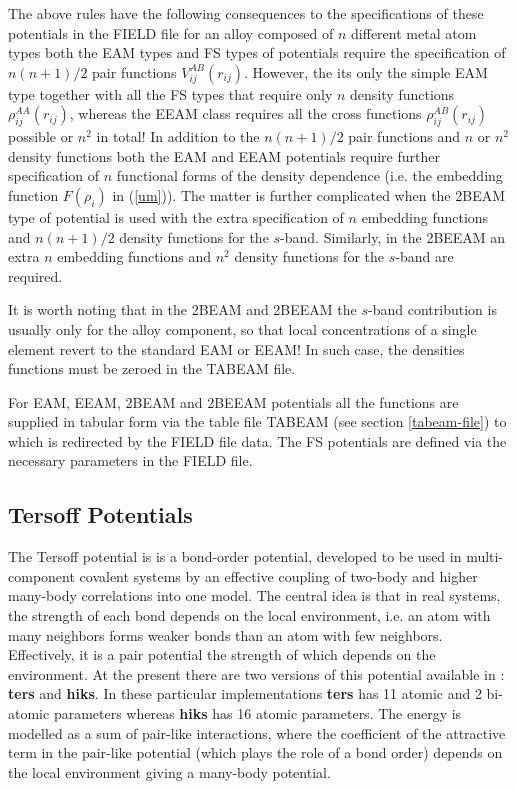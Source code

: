 The above rules have the following consequences to the
specifications of these potentials in the \D FIELD file for an
alloy composed of $n$ different metal atom types both the EAM types
and FS types of potentials require the specification of $n(n+1)/2$
pair functions $V^{AB}_{ij}(r_{ij})$.  However, the its only the simple
EAM type together with all the FS types that require only $n$ density
functions $\rho^{AA}_{ij}(r_{ij})$, whereas the EEAM class requires all
the cross functions $\rho^{AB}_{ij}(r_{ij})$ possible or $n^{2}$ in total!
In addition to the $n(n+1)/2$ pair functions and $n$ or $n^{2}$ density
functions both the EAM and EEAM potentials require further specification
of $n$ functional forms of the density dependence (i.e. the embedding
function $F(\rho_{i})$ in (\ref{um})).  The matter is further complicated
when the 2BEAM type of potential is used with the extra specification of
$n$ embedding functions and $n(n+1)/2$ density functions for the $s$-band.
Similarly, in the 2BEEAM an extra $n$ embedding functions and $n^{2}$
density functions for the $s$-band are required.

It is worth noting that in the 2BEAM and 2BEEAM the $s$-band contribution
is usually only for the alloy component, so that local concentrations of
a single element revert to the standard EAM or EEAM!  In such case, the
densities functions must be zeroed in the \D TABEAM file.

For EAM, EEAM, 2BEAM and 2BEEAM potentials all the functions are supplied
in tabular form via the table file TABEAM (see section \ref{tabeam-file})
to which \D is redirected by the FIELD file data.  The FS potentials are
defined via the necessary parameters in the FIELD file.

\subsection{Tersoff Potentials}
\label{tersoff}

The Tersoff \cite{tersoff-89a} potential is
is a bond-order potential, developed to be used in multi-component
covalent systems by an effective coupling of two-body and higher
many-body correlations into one model.  The central idea is that in
real systems, the strength of each bond depends on the local
environment, i.e. an atom with many neighbors forms weaker bonds
than an atom with few neighbors.  Effectively, it is a pair potential
the strength of which depends on the environment.  At the present there
are two versions of this potential available in \D: {\bf ters} and
{\bf hiks}.  In these particular implementations {\bf ters} has 11
atomic and 2 bi-atomic parameters whereas {\bf hiks} \cite{kumagai-07a}
has 16 atomic parameters.  The energy is modelled as a sum of pair-like
interactions, where the coefficient of the attractive term in the
pair-like potential (which plays the role of a bond order) depends on
the local environment giving a many-body potential.

